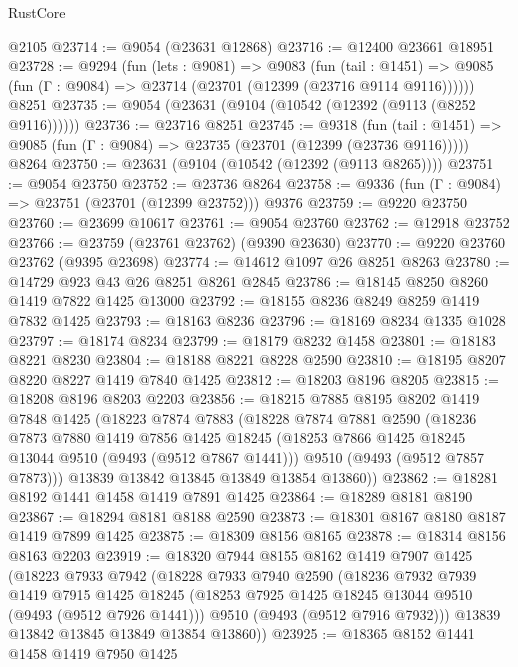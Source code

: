 \begin{lexlean}{RustCore}
\begin{coremodule}
    @2105
@23714 := @9054 (@23631 @12868)
@23716 := @12400 @23661 @18951
@23728 := @9294
    (fun (lets : @9081) =>
    @9083
      (fun (tail : @1451) =>
      @9085 (fun (Γ : @9084) => @23714 (@23701 (@12399 (@23716 @9114 @9116))))))
    @8251
@23735 := @9054 (@23631 (@9104 (@10542 (@12392 (@9113 (@8252 @9116))))))
@23736 := @23716 @8251
@23745 := @9318
    (fun (tail : @1451) => @9085 (fun (Γ : @9084) => @23735 (@23701 (@12399 (@23736 @9116)))))
    @8264
@23750 := @23631 (@9104 (@10542 (@12392 (@9113 @8265))))
@23751 := @9054 @23750
@23752 := @23736 @8264
@23758 := @9336 (fun (Γ : @9084) => @23751 (@23701 (@12399 @23752))) @9376
@23759 := @9220 @23750
@23760 := @23699 @10617
@23761 := @9054 @23760
@23762 := @12918 @23752
@23766 := @23759 (@23761 @23762) (@9390 @23630)
@23770 := @9220 @23760 @23762 (@9395 @23698)
@23774 := @14612 @1097 @26 @8251 @8263
@23780 := @14729 @923 @43 @26 @8251 @8261 @2845
@23786 := @18145 @8250 @8260 @1419 @7822 @1425 @13000
@23792 := @18155 @8236 @8249 @8259 @1419 @7832 @1425
@23793 := @18163 @8236
@23796 := @18169 @8234 @1335 @1028
@23797 := @18174 @8234
@23799 := @18179 @8232 @1458
@23801 := @18183 @8221 @8230
@23804 := @18188 @8221 @8228 @2590
@23810 := @18195 @8207 @8220 @8227 @1419 @7840 @1425
@23812 := @18203 @8196 @8205
@23815 := @18208 @8196 @8203 @2203
@23856 := @18215
    @7885
    @8195
    @8202
    @1419
    @7848
    @1425
    (@18223
      @7874
      @7883
      (@18228
        @7874
        @7881
        @2590
        (@18236
          @7873
          @7880
          @1419
          @7856
          @1425
          @18245
          (@18253 @7866 @1425 @18245 @13044 @9510 (@9493 (@9512 @7867 @1441)))
          @9510
          (@9493 (@9512 @7857 @7873)))
        @13839
        @13842
        @13845
        @13849
        @13854
        @13860))
@23862 := @18281 @8192 @1441 @1458 @1419 @7891 @1425
@23864 := @18289 @8181 @8190
@23867 := @18294 @8181 @8188 @2590
@23873 := @18301 @8167 @8180 @8187 @1419 @7899 @1425
@23875 := @18309 @8156 @8165
@23878 := @18314 @8156 @8163 @2203
@23919 := @18320
    @7944
    @8155
    @8162
    @1419
    @7907
    @1425
    (@18223
      @7933
      @7942
      (@18228
        @7933
        @7940
        @2590
        (@18236
          @7932
          @7939
          @1419
          @7915
          @1425
          @18245
          (@18253 @7925 @1425 @18245 @13044 @9510 (@9493 (@9512 @7926 @1441)))
          @9510
          (@9493 (@9512 @7916 @7932)))
        @13839
        @13842
        @13845
        @13849
        @13854
        @13860))
@23925 := @18365 @8152 @1441 @1458 @1419 @7950 @1425

\end{coremodule}
\end{lexlean}
